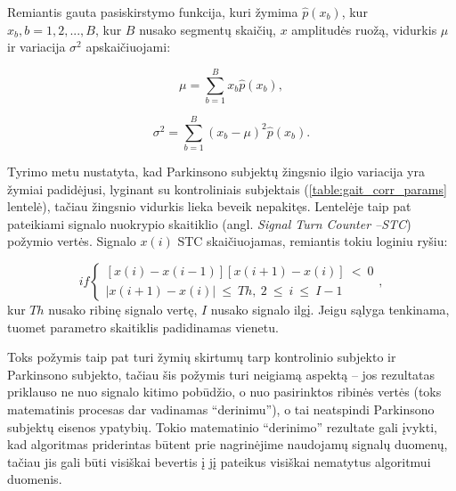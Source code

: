 \documentclass[]{vgtuef}
\begin{document}
Remiantis gauta pasiskirstymo funkcija, kuri žymima  $\hat{p}(x_b)$, kur $x_b, b = 1, 2, ..., B$, kur $B$ nusako segmentų skaičių, $x$ amplitudės ruožą, vidurkis $\mu$ ir variacija $\sigma^2$ apskaičiuojami:

\begin{equation}
\mu = \sum_{b=1}^{B} x_b \hat{p}(x_b),
\end{equation}

\begin{equation}
\sigma^2 = \sum_{b=1}^{B} (x_b - \mu)^2 \hat{p}(x_b).
\end{equation}

Tyrimo metu nustatyta, kad Parkinsono subjektų žingsnio ilgio variacija yra žymiai padidėjusi, lyginant su kontroliniais subjektais (\ref{table:gait_corr_params} lentelė), tačiau žingsnio vidurkis lieka beveik nepakitęs. Lentelėje taip pat pateikiami signalo nuokrypio skaitiklio (angl. \textit{Signal Turn Counter --STC}) požymio vertės. Signalo $x(i)$ STC skaičiuojamas, remiantis tokiu loginiu ryšiu:

\begin{equation}
 if \left\{ \begin{array}{l}
 	[x(i)-x(i-1)][x(i+1)-x(i)]~<~0 \\
 	|x(i+1)-x(i)| ~\leq~Th,~2~\leq~i~\leq~I-1
 \end{array} \right. ,
\end{equation}
kur $Th$ nusako ribinę signalo vertę, $I$ nusako signalo ilgį. Jeigu sąlyga tenkinama, tuomet parametro skaitiklis padidinamas vienetu.

Toks požymis taip pat turi žymių skirtumų tarp kontrolinio subjekto ir Parkinsono subjekto, tačiau šis požymis turi neigiamą aspektą -- jos rezultatas priklauso ne nuo signalo kitimo pobūdžio, o nuo pasirinktos ribinės vertės (toks matematinis procesas dar vadinamas ``derinimu''), o tai neatspindi Parkinsono subjektų eisenos ypatybių. Tokio matematinio ``derinimo'' rezultate gali įvykti, kad algoritmas priderintas būtent prie nagrinėjime naudojamų signalų duomenų, tačiau jis gali būti visiškai bevertis į jį pateikus visiškai nematytus algoritmui duomenis.
\end{document}
